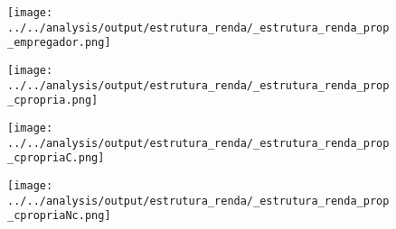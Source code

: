 \begin{frame}[label=_estrutura_renda_prop_empregador]{}
\textit{\hyperlink{_estrutura_renda}{}}
\begin{figure}
  \centering
  \texttt{[image: ../../analysis/output/estrutura\_renda/\_estrutura\_renda\_prop\_empregador.png]}
  \caption{}
  \label{fig:_estrutura_renda_prop_empregador}
\end{figure}
\end{frame}



\begin{frame}[label=_estrutura_renda_prop_cpropria]{}
\textit{\hyperlink{_estrutura_renda}{}}
\begin{figure}
  \centering
  \texttt{[image: ../../analysis/output/estrutura\_renda/\_estrutura\_renda\_prop\_cpropria.png]}
  \caption{}
  \label{fig:_estrutura_renda_prop_cpropria}
\end{figure}
\end{frame}

\begin{frame}[label=_estrutura_renda_prop_cpropriaC]{}
\textit{\hyperlink{_estrutura_renda}{}}
\begin{figure}
  \centering
  \texttt{[image: ../../analysis/output/estrutura\_renda/\_estrutura\_renda\_prop\_cpropriaC.png]}
  \caption{}
  \label{fig:_estrutura_renda_prop_cpropriaC}
\end{figure}
\end{frame}

\begin{frame}[label=_estrutura_renda_prop_cpropriaNc]{}
\textit{\hyperlink{_estrutura_renda}{}}
\begin{figure}
  \centering
  \texttt{[image: ../../analysis/output/estrutura\_renda/\_estrutura\_renda\_prop\_cpropriaNc.png]}
  \caption{}
  \label{fig:_estrutura_renda_prop_cpropriaNc}
\end{figure}
\end{frame}